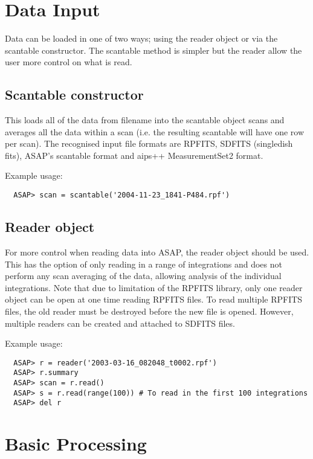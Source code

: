 \documentclass[11pt]{article}
\begin{document}
\section{Data Input}

Data can be loaded in one of two ways; using the reader object or via
the scantable constructor. The scantable method is simpler but the
reader allow the user more control on what is read.

\subsection{Scantable constructor}

This loads all of the data from filename into the scantable object scans
and averages all the data within a scan (i.e.  the resulting scantable
will have one row per scan).  The recognised input file formats are
RPFITS, SDFITS (singledish fits), ASAP's scantable format and aips++
MeasurementSet2 format. 


Example usage:

\begin{verbatim}
  ASAP> scan = scantable('2004-11-23_1841-P484.rpf')
\end{verbatim}


\subsection{Reader object}

For more control when reading data into ASAP, the reader object should
be used.  This has the option of only reading in a range of integrations
and does not perform any scan averaging of the data, allowing analysis
of the individual integrations.  Note that due to limitation of the
RPFITS library, only one reader object can be open at one time reading
RPFITS files.  To read multiple RPFITS files, the old reader must be
destroyed before the new file is opened.  However, multiple readers can
be created and attached to SDFITS files. 


Example usage:

\begin{verbatim}
  ASAP> r = reader('2003-03-16_082048_t0002.rpf')
  ASAP> r.summary 
  ASAP> scan = r.read()
  ASAP> s = r.read(range(100)) # To read in the first 100 integrations
  ASAP> del r
\end{verbatim}

\section{Basic Processing}
\end{document}
